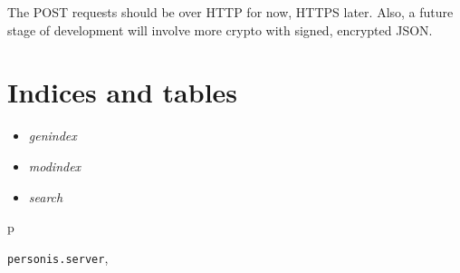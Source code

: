 \documentclass[letterpaper,10pt,english]{sphinxmanual}
\begin{document}
The POST requests should be over HTTP for now, HTTPS later. Also, a future stage of development will involve more crypto with signed, encrypted JSON.


\chapter{Indices and tables}
\label{index:indices-and-tables}\begin{itemize}
\item {} 
\emph{genindex}

\item {} 
\emph{modindex}

\item {} 
\emph{search}

\end{itemize}


\renewcommand{\indexname}{Python Module Index}
\begin{theindex}
\def\bigletter#1{{\Large\sffamily#1}\nopagebreak\vspace{1mm}}
\bigletter{p}
\item {\texttt{personis.server}}, \pageref{API:module-personis.server}
\end{theindex}

\renewcommand{\indexname}{Index}
\printindex
\end{document}
